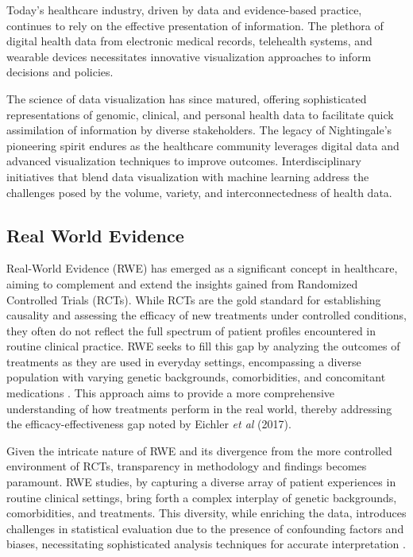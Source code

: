 Today's healthcare industry, driven by data and evidence-based practice, continues to rely on the effective presentation of information. The plethora of digital health data from electronic medical records, telehealth systems, and wearable devices necessitates innovative visualization approaches to inform decisions and policies.

The science of data visualization has since matured, offering sophisticated representations of genomic, clinical, and personal health data to facilitate quick assimilation of information by diverse stakeholders. The legacy of Nightingale's pioneering spirit endures as the healthcare community leverages digital data and advanced visualization techniques to improve outcomes. Interdisciplinary initiatives that blend data visualization with machine learning address the challenges posed by the volume, variety, and interconnectedness of health data.

\subsection{Real World Evidence}\label{real-world-evidence}

Real-World Evidence (RWE) has emerged as a significant concept in healthcare, aiming to complement and extend the insights gained from Randomized Controlled Trials (RCTs). While RCTs are the gold standard for establishing causality and assessing the efficacy of new treatments under controlled conditions, they often do not reflect the full spectrum of patient profiles encountered in routine clinical practice. RWE seeks to fill this gap by analyzing the outcomes of treatments as they are used in everyday settings, encompassing a diverse population with varying genetic backgrounds, comorbidities, and concomitant medications \cite{soa1}. This approach aims to provide a more comprehensive understanding of how treatments perform in the real world, thereby addressing the efficacy-effectiveness gap noted by Eichler \textit{et al} (2017)\cite{soa2}.

Given the intricate nature of RWE and its divergence from the more controlled environment of RCTs, transparency in methodology and findings becomes paramount. RWE studies, by capturing a diverse array of patient experiences in routine clinical settings, bring forth a complex interplay of genetic backgrounds, comorbidities, and treatments. This diversity, while enriching the data, introduces challenges in statistical evaluation due to the presence of confounding factors and biases, necessitating sophisticated analysis techniques for accurate interpretation \cite{soa3}\cite{soa4}.

